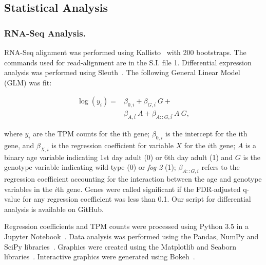 \documentclass[10pt,letterpaper,twocolumn]{article}
\newcommand{\fog}{\emph{\mbox{fog-2}}}
\begin{document}

\subsection*{Statistical Analysis}
\label{sb:statistics}
\subsubsection*{RNA-Seq Analysis.}
\label{sb:model}
RNA-Seq alignment was performed using Kallisto~\cite{Bray2016} with 200
bootstraps. The commands used for read-alignment are in the S.I. file 1.
Differential expression analysis was performed using Sleuth~\cite{Pimentel2016}.
The following General Linear Model (GLM) was fit:

\begin{align*}
  \log(y_i) =& \beta_{0,i} + \beta_{G,i}\dot~G + \\
  &\beta_{A,i}\dot~A + \beta_{A::G,i}\dot~A~G,
  \label{eqn:GLM}
\end{align*}

where $y_i$ are the TPM counts for the ith gene; $\beta_{0,i}$ is the intercept
for the ith gene, and $\beta_{X,i}$ is the regression coefficient for variable
$X$ for the $i$th gene; $A$ is a binary age variable indicating 1st day adult
(0) or 6th day adult (1) and $G$ is the genotype variable indicating wild-type
(0) or \fog{} (1); $\beta_{A::G, i}$ refers to the regression coefficient
accounting for the interaction between the age and genotype variables in the
$i$th gene. Genes were called significant if the FDR-adjusted q-value for any
regression coefficient was less than 0.1. Our script for differential analysis
is available on GitHub.

Regression coefficients and TPM counts were processed using Python 3.5 in a
Jupyter Notebook~\cite{Perez2007}. Data analysis was performed using the Pandas,
NumPy and SciPy libraries~\cite{McKinney2011,VanDerWalt2011,Oliphant2007}.
Graphics were created using the Matplotlib and Seaborn
libraries~\cite{Waskom,Hunter2007}. Interactive graphics were generated using
Bokeh~\cite{Team2014}.
\end{document}
